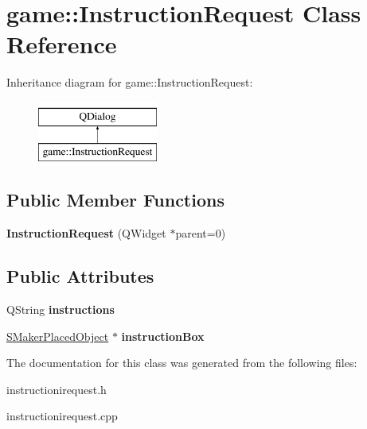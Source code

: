 \hypertarget{classgame_1_1InstructionRequest}{}\section{game\+:\+:Instruction\+Request Class Reference}
\label{classgame_1_1InstructionRequest}
Inheritance diagram for game\+:\+:Instruction\+Request\+:\begin{figure}[H]
\begin{center}
\leavevmode
\includegraphics[height=2.000000cm]{classgame_1_1InstructionRequest}
\end{center}
\end{figure}
\subsection*{Public Member Functions}
\begin{DoxyCompactItemize}
\item 
\mbox{\label{classgame_1_1InstructionRequest_a791e508bd6068b6bd703fd3f9782271f}} 
{\bfseries Instruction\+Request} (Q\+Widget $\ast$parent=0)
\end{DoxyCompactItemize}
\subsection*{Public Attributes}
\begin{DoxyCompactItemize}
\item 
\mbox{\label{classgame_1_1InstructionRequest_ab2d24dd114d756dad37921ef4dcfc662}} 
Q\+String {\bfseries instructions}
\item 
\mbox{\label{classgame_1_1InstructionRequest_abb5c66025d6efc5921cbb1e74b2f7870}} 
\hyperlink{structgame_1_1SMakerPlacedObject}{S\+Maker\+Placed\+Object} $\ast$ {\bfseries instruction\+Box}
\end{DoxyCompactItemize}


The documentation for this class was generated from the following files\+:\begin{DoxyCompactItemize}
\item 
instructionirequest.\+h\item 
instructionirequest.\+cpp\end{DoxyCompactItemize}
